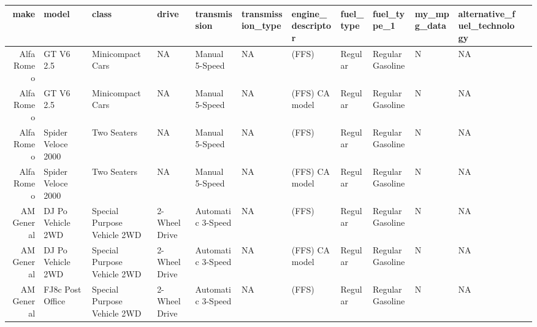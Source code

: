 \documentclass[11pt]{article}
\begin{document}
    \begin{tabular}{r|lllllllllll}
 make & model & class & drive & transmission & transmission\_type & engine\_descriptor & fuel\_type & fuel\_type\_1 & my\_mpg\_data & alternative\_fuel\_technology\\
\hline
	 Alfa Romeo                  & GT V6 2.5                   & Minicompact Cars            & NA                          & Manual 5-Speed              & NA                          & (FFS)                       & Regular                     & Regular Gasoline            & N                           & NA                         \\
	 Alfa Romeo                  & GT V6 2.5                   & Minicompact Cars            & NA                          & Manual 5-Speed              & NA                          & (FFS) CA model              & Regular                     & Regular Gasoline            & N                           & NA                         \\
	 Alfa Romeo                  & Spider Veloce 2000          & Two Seaters                 & NA                          & Manual 5-Speed              & NA                          & (FFS)                       & Regular                     & Regular Gasoline            & N                           & NA                         \\
	 Alfa Romeo                  & Spider Veloce 2000          & Two Seaters                 & NA                          & Manual 5-Speed              & NA                          & (FFS) CA model              & Regular                     & Regular Gasoline            & N                           & NA                         \\
	 AM General                  & DJ Po Vehicle 2WD           & Special Purpose Vehicle 2WD & 2-Wheel Drive               & Automatic 3-Speed           & NA                          & (FFS)                       & Regular                     & Regular Gasoline            & N                           & NA                         \\
	 AM General                  & DJ Po Vehicle 2WD           & Special Purpose Vehicle 2WD & 2-Wheel Drive               & Automatic 3-Speed           & NA                          & (FFS) CA model              & Regular                     & Regular Gasoline            & N                           & NA                         \\
	 AM General                  & FJ8c Post Office            & Special Purpose Vehicle 2WD & 2-Wheel Drive               & Automatic 3-Speed           & NA                          & (FFS)                       & Regular                     & Regular Gasoline            & N                           & NA                         \\

\end{tabular}
\end{document}
